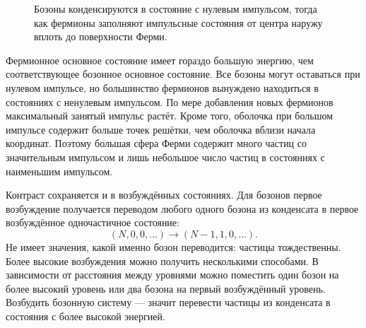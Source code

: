 \begin{figure}
\centering
{}
\caption{Бозоны конденсируются в состояние с нулевым импульсом, тогда как фермионы заполняют импульсные состояния от центра наружу вплоть до поверхности Ферми.}
\end{figure}

Фермионное основное состояние имеет гораздо большую энергию, чем соответствующее бозонное основное состояние. Все бозоны могут оставаться при нулевом импульсе, но большинство фермионов вынуждено находиться в состояниях с ненулевым импульсом. По мере добавления новых фермионов максимальный занятый импульс растёт. Кроме того, оболочка при большом импульсе содержит больше точек решётки, чем оболочка вблизи начала координат. Поэтому большая сфера Ферми содержит много частиц со значительным импульсом и лишь небольшое число частиц в состояниях с наименьшим импульсом.

Контраст сохраняется и в возбуждённых состояниях. Для бозонов первое возбуждение получается переводом любого одного бозона из конденсата в первое возбуждённое одночастичное состояние:
\begin{equation}
(N,0,0,\ldots)\longrightarrow (N-1,1,0,\ldots).
\end{equation}
Не имеет значения, какой именно бозон переводится: частицы тождественны. Более высокие возбуждения можно получить несколькими способами. В зависимости от расстояния между уровнями можно поместить один бозон на более высокий уровень или два бозона на первый возбуждённый уровень. Возбудить бозонную систему — значит перевести частицы из конденсата в состояния с более высокой энергией.

